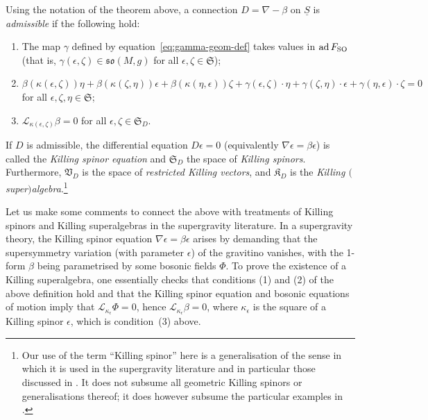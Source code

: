 \documentclass[10pt,a4paper]{amsart}
\numberwithin{equation}{section}
\newcommand{\fso}{\mathfrak{so}}
\newcommand{\fK}{\mathfrak{K}}
\newcommand{\fS}{\mathfrak{S}}
\newcommand{\fV}{\mathfrak{V}}
\newcommand{\eL}{\mathscr{L}}
\newcommand{\Sbundle}{\underline{S}}
\newcommand{\1}{\mathbbm{1}}
\DeclareMathOperator{\ad}{ad}
\begin{document}
\begin{Definition}\label{def:killing-spinor}
	Using the notation of the theorem above, a connection $D=\nabla-\beta$ on $\Sbundle$ is \emph{admissible} if the following hold:
	\begin{enumerate}\itemsep=0pt
		\item The map $\gamma$ defined by equation~\eqref{eq:gamma-geom-def} takes values in $\ad F_{\rm SO}$ (that is, $\gamma(\epsilon,\zeta)\in\fso(M,g)$ for all $\epsilon,\zeta\in\fS$); %

		\item $
\beta(\kappa(\epsilon,\zeta))\eta + \beta(\kappa(\zeta,\eta))\epsilon + \beta(\kappa(\eta,\epsilon))\zeta
				+ \gamma(\epsilon,\zeta)\cdot\eta + \gamma(\zeta,\eta)\cdot\epsilon +\gamma(\eta,\epsilon)\cdot\zeta
				= 0$ for all $\epsilon,\zeta,\eta\in\fS$; %

		\item $\eL_{\kappa(\epsilon,\zeta)}\beta = 0$ for all $\epsilon,\zeta\in\fS_D$. %
	\end{enumerate}
	If $D$ is admissible, the differential equation $D\epsilon=0$ (equivalently $\nabla\epsilon =\beta\epsilon$) is called the \emph{Killing spinor equation} and $\fS_D$ the space of \emph{Killing spinors}. Furthermore, $\fV_D$ is the space of \emph{restricted Killing vectors}, and $\fK_D$ is the \emph{Killing $($super$)$algebra}.\footnote{Our use of the term ``Killing spinor'' here is a generalisation of the sense in which it is used in the supergravity literature and in particular those discussed in \cite{Beckett2021,deMedeiros2016,deMedeiros2018,Figueroa-OFarrill2017_1,Figueroa-OFarrill2017}. It does not subsume all geometric Killing spinors or generalisations thereof; it does however subsume the particular examples in \cite{Figueroa-OFarrill2008_except}.}
\end{Definition}

Let us make some comments to connect the above with treatments of Killing spinors and Killing superalgebras in the supergravity literature. In a supergravity theory, the Killing spinor equation $\nabla\epsilon=\beta\epsilon$ arises by demanding that the supersymmetry variation (with parameter $\epsilon$) of the gravitino vanishes, with the 1-form $\beta$ being parametrised by some bosonic fields $\Phi$. To prove the existence of a Killing superalgebra, one essentially checks that conditions (1) and (2) of the above definition hold and that the Killing spinor equation and bosonic equations of motion imply that $\eL_{\kappa_\epsilon}\Phi=0$, hence $\eL_{\kappa_\epsilon}\beta=0$, where $\kappa_\epsilon$ is the square of a Killing spinor $\epsilon$, which is condition~(3) above.
\end{document}
